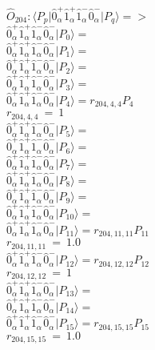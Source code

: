 \documentclass[14pt]{article}
\begin{document}
    $\hat{O}_{204}:  \langle{P_p}\vert \hat{0}_{\alpha}^{+}\hat{1}_{\alpha}^{+}\hat{1}_{\alpha}^{-}\hat{0}_{\alpha}^{-} \vert{P_q}\rangle => $ \\ 
    $ \hat{0}_{\alpha}^{+}\hat{1}_{\alpha}^{+}\hat{1}_{\alpha}^{-}\hat{0}_{\alpha}^{-} \vert{P_{0}}\rangle =  $ \\ 
    $ \hat{0}_{\alpha}^{+}\hat{1}_{\alpha}^{+}\hat{1}_{\alpha}^{-}\hat{0}_{\alpha}^{-} \vert{P_{1}}\rangle =  $ \\ 
    $ \hat{0}_{\alpha}^{+}\hat{1}_{\alpha}^{+}\hat{1}_{\alpha}^{-}\hat{0}_{\alpha}^{-} \vert{P_{2}}\rangle =  $ \\ 
    $ \hat{0}_{\alpha}^{+}\hat{1}_{\alpha}^{+}\hat{1}_{\alpha}^{-}\hat{0}_{\alpha}^{-} \vert{P_{3}}\rangle =  $ \\ 
    $ \hat{0}_{\alpha}^{+}\hat{1}_{\alpha}^{+}\hat{1}_{\alpha}^{-}\hat{0}_{\alpha}^{-} \vert{P_{4}}\rangle = {r}_{204,4,4}P_{4} $ \\ 
    ${r}_{204,4,4}\ =\ 1 $ \\ 
    $ \hat{0}_{\alpha}^{+}\hat{1}_{\alpha}^{+}\hat{1}_{\alpha}^{-}\hat{0}_{\alpha}^{-} \vert{P_{5}}\rangle =  $ \\ 
    $ \hat{0}_{\alpha}^{+}\hat{1}_{\alpha}^{+}\hat{1}_{\alpha}^{-}\hat{0}_{\alpha}^{-} \vert{P_{6}}\rangle =  $ \\ 
    $ \hat{0}_{\alpha}^{+}\hat{1}_{\alpha}^{+}\hat{1}_{\alpha}^{-}\hat{0}_{\alpha}^{-} \vert{P_{7}}\rangle =  $ \\ 
    $ \hat{0}_{\alpha}^{+}\hat{1}_{\alpha}^{+}\hat{1}_{\alpha}^{-}\hat{0}_{\alpha}^{-} \vert{P_{8}}\rangle =  $ \\ 
    $ \hat{0}_{\alpha}^{+}\hat{1}_{\alpha}^{+}\hat{1}_{\alpha}^{-}\hat{0}_{\alpha}^{-} \vert{P_{9}}\rangle =  $ \\ 
    $ \hat{0}_{\alpha}^{+}\hat{1}_{\alpha}^{+}\hat{1}_{\alpha}^{-}\hat{0}_{\alpha}^{-} \vert{P_{10}}\rangle =  $ \\ 
    $ \hat{0}_{\alpha}^{+}\hat{1}_{\alpha}^{+}\hat{1}_{\alpha}^{-}\hat{0}_{\alpha}^{-} \vert{P_{11}}\rangle = {r}_{204,11,11}P_{11} $ \\ 
    ${r}_{204,11,11}\ =\ 1.0 $ \\ 
    $ \hat{0}_{\alpha}^{+}\hat{1}_{\alpha}^{+}\hat{1}_{\alpha}^{-}\hat{0}_{\alpha}^{-} \vert{P_{12}}\rangle = {r}_{204,12,12}P_{12} $ \\ 
    ${r}_{204,12,12}\ =\ 1 $ \\ 
    $ \hat{0}_{\alpha}^{+}\hat{1}_{\alpha}^{+}\hat{1}_{\alpha}^{-}\hat{0}_{\alpha}^{-} \vert{P_{13}}\rangle =  $ \\ 
    $ \hat{0}_{\alpha}^{+}\hat{1}_{\alpha}^{+}\hat{1}_{\alpha}^{-}\hat{0}_{\alpha}^{-} \vert{P_{14}}\rangle =  $ \\ 
    $ \hat{0}_{\alpha}^{+}\hat{1}_{\alpha}^{+}\hat{1}_{\alpha}^{-}\hat{0}_{\alpha}^{-} \vert{P_{15}}\rangle = {r}_{204,15,15}P_{15} $ \\ 
    ${r}_{204,15,15}\ =\ 1.0 $ \\ 
    
\end{document}
